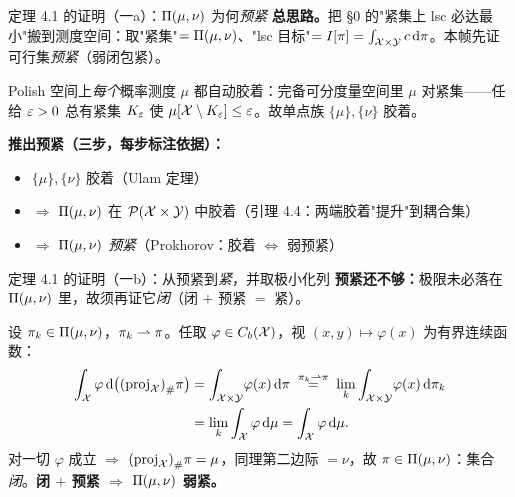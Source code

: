 \begin{frame}{定理 4.1 的证明（一a）：$\Pi(\mu,\nu)$ 为何\emph{预紧}}
  \textbf{总思路。}\proofskipnote 把 §0 的"紧集上 lsc 必达最小"搬到测度空间：取"紧集"$=\Pi(\mu,\nu)$、"lsc 目标"$=I[\pi]=\int_{\mathcal{X}\times\mathcal{Y}} c\,\mathrm{d}\pi$。本帧先证可行集\emph{预紧}（弱闭包紧）。

   Polish 空间上\emph{每个}概率测度 $\mu$ 都自动胶着：完备可分度量空间里 $\mu$ 对紧集——任给 $\varepsilon>0$ 总有紧集 $K_\varepsilon$ 使 $\mu[\mathcal{X}\setminus K_\varepsilon]\le\varepsilon$。故单点族 $\{\mu\},\{\nu\}$ 胶着。

  \textbf{推出预紧（三步，每步标注依据）：}
  \begin{itemize}\small
    \item $\{\mu\},\{\nu\}$ 胶着\hfill（Ulam 定理）
    \item $\Rightarrow$ $\Pi(\mu,\nu)$ 在 $\mathcal{P}(\mathcal{X}\times\mathcal{Y})$ 中胶着\hfill（引理 4.4：两端胶着"提升"到耦合集）
    \item $\Rightarrow$ $\Pi(\mu,\nu)$ \emph{预紧}\hfill（Prokhorov：胶着 $\Leftrightarrow$ 弱预紧）
  \end{itemize}

\end{frame}

\begin{frame}{定理 4.1 的证明（一b）：从预紧到\emph{紧}，并取极小化列}
  \textbf{预紧还不够：}极限未必落在 $\Pi(\mu,\nu)$ 里，故须再证它\emph{闭}（闭 $+$ 预紧 $=$ 紧）。\proofskipnote

  设 $\pi_k\in\Pi(\mu,\nu)$，$\pi_k\rightharpoonup\pi$。任取 $\varphi\in C_b(\mathcal{X})$，视 $(x,y)\mapsto\varphi(x)$ 为有界连续函数：
  \begin{align*}
    \int_{\mathcal{X}}\varphi\,\mathrm{d}\big({(\mathrm{proj}_{\mathcal{X}})}_{\#}\pi\big)
    &=\int_{\mathcal{X}\times\mathcal{Y}}\!\varphi(x)\,\mathrm{d}\pi
    \;\overset{\pi_k\rightharpoonup\pi}{=}\;\lim_{k}\int_{\mathcal{X}\times\mathcal{Y}}\!\varphi(x)\,\mathrm{d}\pi_k\\
    &=\lim_{k}\int_{\mathcal{X}}\varphi\,\mathrm{d}\mu=\int_{\mathcal{X}}\varphi\,\mathrm{d}\mu .
  \end{align*}
  对一切 $\varphi$ 成立 $\Rightarrow$ ${(\mathrm{proj}_{\mathcal{X}})}_{\#}\pi=\mu$，同理第二边际 $=\nu$，故 $\pi\in\Pi(\mu,\nu)$：集合\emph{闭}。\textbf{闭 $+$ 预紧 $\Rightarrow$ $\Pi(\mu,\nu)$ 弱紧。}

\end{frame}

